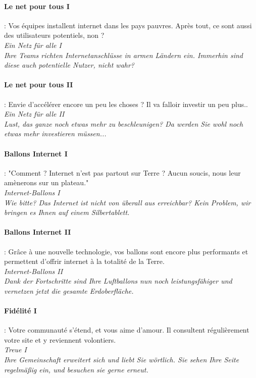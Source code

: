 \documentclass[10pt,a4paper]{article}
\begin{document}
\paragraph{Le net pour tous I} : Vos équipes installent internet dans les pays pauvres. Après tout, ce sont aussi des utilisateurs potentiels, non ?\\
\textit{Ein Netz für alle I}\\
\textit{Ihre Teams richten Internetanschlüsse in armen Ländern ein. Immerhin sind diese auch potentielle Nutzer, nicht wahr?}


\paragraph{Le net pour tous II} : Envie d'accélérer encore un peu les choses ? Il va falloir investir un peu plus..\\
\textit{Ein Netz für alle II}\\
\textit{Lust, das ganze noch etwas mehr zu beschleunigen? Da werden Sie wohl noch etwas mehr investieren müssen...}


\paragraph{Ballons Internet I} : "Comment ? Internet n'est pas partout sur Terre ? Aucun soucis, nous leur amènerons sur un plateau."\\
\textit{Internet-Ballons I}\\
\textit{Wie bitte? Das Internet ist nicht von überall aus erreichbar? Kein Problem, wir bringen es Ihnen auf einem Silbertablett.}


\paragraph{Ballons Internet II} : Grâce à une nouvelle technologie, vos ballons sont encore plus performants et permettent d'offrir internet à la totalité de la Terre.\\
\textit{Internet-Ballons II}\\
\textit{Dank der Fortschritte sind Ihre Luftballons nun noch leistungsfähiger und vernetzen jetzt die gesamte Erdoberfläche.}


\paragraph{Fidélité I} : Votre communauté s'étend, et vous aime d'amour. Il consultent régulièrement votre site et y reviennent volontiers.\\
\textit{Treue I}\\
\textit{Ihre Gemeinschaft erweitert sich und liebt Sie wörtlich. Sie sehen Ihre Seite regelmäßig ein, und besuchen sie gerne erneut.}
\end{document}
